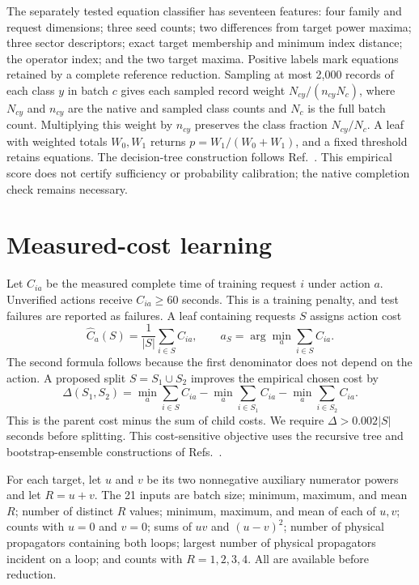 \documentclass[11pt,a4paper]{article}
\begin{document}
The separately tested equation classifier has seventeen features: four family and request dimensions; three seed counts; two differences from target power maxima; three sector descriptors; exact target membership and minimum index distance; the operator index; and the two target maxima. Positive labels mark equations retained by a complete reference reduction. Sampling at most 2,000 records of each class $y$ in batch $c$ gives each sampled record weight $N_{cy}/(n_{cy}N_c)$, where $N_{cy}$ and $n_{cy}$ are the native and sampled class counts and $N_c$ is the full batch count. Multiplying this weight by $n_{cy}$ preserves the class fraction $N_{cy}/N_c$. A leaf with weighted totals $W_0,W_1$ returns $p=W_1/(W_0+W_1)$, and a fixed threshold retains equations. The decision-tree construction follows Ref.~\cite{CART1984}. This empirical score does not certify sufficiency or probability calibration; the native completion check remains necessary.

\section{Measured-cost learning}
\label{notes-direct-app:shared}
Let $C_{ia}$ be the measured complete time of training request $i$ under action $a$. Unverified actions receive $C_{ia}\geq60$ seconds. This is a training penalty, and test failures are reported as failures. A leaf containing requests $S$ assigns action cost
\begin{equation}
 \widehat C_a(S)=\frac{1}{|S|}\sum_{i\in S}C_{ia},\qquad
 a_S=\arg\min_a\sum_{i\in S}C_{ia}.
 \label{notes-direct-eq:cost-leaf}
\end{equation}
The second formula follows because the first denominator does not depend on the action. A proposed split $S=S_1\cup S_2$ improves the empirical chosen cost by
\begin{equation}
 \Delta(S_1,S_2)=\min_a\sum_{i\in S}C_{ia}
 -\min_a\sum_{i\in S_1}C_{ia}
 -\min_a\sum_{i\in S_2}C_{ia}.
 \label{notes-direct-eq:cost-split}
\end{equation}
This is the parent cost minus the sum of child costs. We require $\Delta>0.002|S|$ seconds before splitting. This cost-sensitive objective uses the recursive tree and bootstrap-ensemble constructions of Refs.~\cite{CART1984,Breiman2001Forest}.

For each target, let $u$ and $v$ be its two nonnegative auxiliary numerator powers and let $R=u+v$. The 21 inputs are batch size; minimum, maximum, and mean $R$; number of distinct $R$ values; minimum, maximum, and mean of each of $u,v$; counts with $u=0$ and $v=0$; sums of $uv$ and $(u-v)^2$; number of physical propagators containing both loops; largest number of physical propagators incident on a loop; and counts with $R=1,2,3,4$. All are available before reduction.
\end{document}
